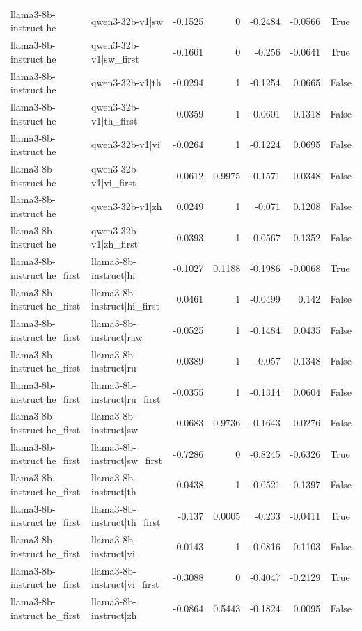 \begin{table}
\begin{tabular}{l l r r r r l}
llama3-8b-instruct|he & qwen3-32b-v1|sw & -0.1525 & 0 & -0.2484 & -0.0566 & True \\
llama3-8b-instruct|he & qwen3-32b-v1|sw_first & -0.1601 & 0 & -0.256 & -0.0641 & True \\
llama3-8b-instruct|he & qwen3-32b-v1|th & -0.0294 & 1 & -0.1254 & 0.0665 & False \\
llama3-8b-instruct|he & qwen3-32b-v1|th_first & 0.0359 & 1 & -0.0601 & 0.1318 & False \\
llama3-8b-instruct|he & qwen3-32b-v1|vi & -0.0264 & 1 & -0.1224 & 0.0695 & False \\
llama3-8b-instruct|he & qwen3-32b-v1|vi_first & -0.0612 & 0.9975 & -0.1571 & 0.0348 & False \\
llama3-8b-instruct|he & qwen3-32b-v1|zh & 0.0249 & 1 & -0.071 & 0.1208 & False \\
llama3-8b-instruct|he & qwen3-32b-v1|zh_first & 0.0393 & 1 & -0.0567 & 0.1352 & False \\
llama3-8b-instruct|he_first & llama3-8b-instruct|hi & -0.1027 & 0.1188 & -0.1986 & -0.0068 & True \\
llama3-8b-instruct|he_first & llama3-8b-instruct|hi_first & 0.0461 & 1 & -0.0499 & 0.142 & False \\
llama3-8b-instruct|he_first & llama3-8b-instruct|raw & -0.0525 & 1 & -0.1484 & 0.0435 & False \\
llama3-8b-instruct|he_first & llama3-8b-instruct|ru & 0.0389 & 1 & -0.057 & 0.1348 & False \\
llama3-8b-instruct|he_first & llama3-8b-instruct|ru_first & -0.0355 & 1 & -0.1314 & 0.0604 & False \\
llama3-8b-instruct|he_first & llama3-8b-instruct|sw & -0.0683 & 0.9736 & -0.1643 & 0.0276 & False \\
llama3-8b-instruct|he_first & llama3-8b-instruct|sw_first & -0.7286 & 0 & -0.8245 & -0.6326 & True \\
llama3-8b-instruct|he_first & llama3-8b-instruct|th & 0.0438 & 1 & -0.0521 & 0.1397 & False \\
llama3-8b-instruct|he_first & llama3-8b-instruct|th_first & -0.137 & 0.0005 & -0.233 & -0.0411 & True \\
llama3-8b-instruct|he_first & llama3-8b-instruct|vi & 0.0143 & 1 & -0.0816 & 0.1103 & False \\
llama3-8b-instruct|he_first & llama3-8b-instruct|vi_first & -0.3088 & 0 & -0.4047 & -0.2129 & True \\
llama3-8b-instruct|he_first & llama3-8b-instruct|zh & -0.0864 & 0.5443 & -0.1824 & 0.0095 & False \\

\end{tabular}
\end{table}
